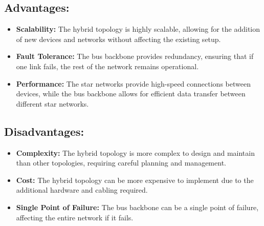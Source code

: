 \documentclass[a4paper]{exam}
\begin{document}
\begin{questions}
\begin{solution}
\begin{parts}
\begin{center}
\begin{minipage}{\textwidth}
                    \end{minipage}
                \end{center}
                \subsection*{Advantages:}
                \begin{itemize}
                    \item \textbf{Scalability:} The hybrid topology is highly scalable, allowing for the addition of new devices and networks without affecting the existing setup.
                    \item \textbf{Fault Tolerance:} The bus backbone provides redundancy, ensuring that if one link fails, the rest of the network remains operational.
                    \item \textbf{Performance:} The star networks provide high-speed connections between devices, while the bus backbone allows for efficient data transfer between different star networks.
                \end{itemize}
                \subsection*{Disadvantages:}
                \begin{itemize}
                    \item \textbf{Complexity:} The hybrid topology is more complex to design and maintain than other topologies, requiring careful planning and management.
                    \item \textbf{Cost:} The hybrid topology can be more expensive to implement due to the additional hardware and cabling required.
                    \item \textbf{Single Point of Failure:} The bus backbone can be a single point of failure, affecting the entire network if it fails.
                \end{itemize}

\end{parts}
\end{solution}
\end{questions}
\end{document}

